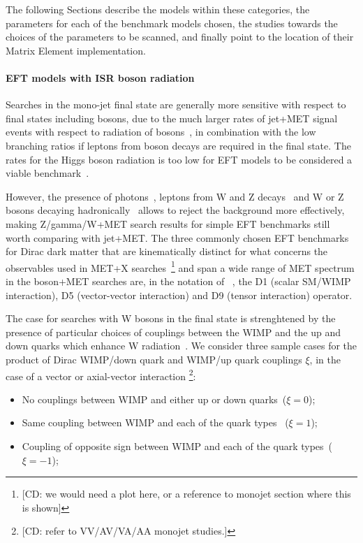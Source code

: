 The following Sections describe the models within these categories, 
the parameters for each of the benchmark models chosen,
the studies towards the choices of the parameters to be scanned, 
and finally point to the location of their Matrix Element 
implementation. 

\paragraph{EFT models with ISR boson radiation}

Searches in the mono-jet final state are generally more sensitive
with respect to final states including bosons, due to the much 
larger rates of jet+MET signal events with 
respect to radiation of bosons~\citep{Zhou:2013fla}, 
in combination with the low branching ratios if leptons from 
boson decays are required in the final state. 
The rates for the Higgs boson radiation is too low for EFT models 
to be considered a viable benchmark~\citep{Carpenter:2013xra}.

However, the presence of photons~\citep{Khachatryan:2014rwa, Aad:2014vka}, 
leptons from W and Z decays~\citep{Khachatryan:2014tva, Aad:2014vka, ATLAS:2014wra} and W or Z bosons decaying hadronically~\citep{Aad:2013oja}
allows to reject the background more effectively, making Z/gamma/W+MET search results for simple EFT benchmarks still worth comparing with jet+MET. 
The three commonly chosen EFT benchmarks for Dirac dark matter that are kinematically distinct for what concerns the observables used in MET+X searches~\footnote{[CD: we would need a plot here, or a reference to monojet section where this is shown]} and span a wide range of MET spectrum in the boson+MET searches are, in the notation of ~\citep{Goodman:2010ku}, the D1 (scalar SM/WIMP interaction), D5 (vector-vector interaction) and D9 (tensor interaction) operator. 

The case for searches with W bosons in the final state is strenghtened by the presence of particular choices of couplings between the WIMP and the up and down quarks which enhance W radiation~\citep{Bai:2012xg}. 
We consider three sample cases for the product of 
Dirac WIMP/down quark and WIMP/up quark couplings $\xi$,
in the case of a vector or axial-vector interaction
\footnote{[CD: refer to VV/AV/VA/AA monojet studies.]}: 
\begin{itemize}
 \item No couplings between WIMP and either up or down quarks~($\xi=0$);
 \item Same coupling between WIMP and each of the quark types~ ($\xi=1$);
 \item Coupling of opposite sign between WIMP and each of the quark types~($\xi=-1$);
\end{itemize}

